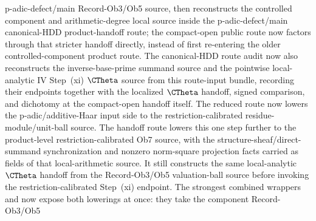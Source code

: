 \begin{proposition}
  p-adic-defect/main Record-Ob3/Ob5 source, then reconstructs the controlled
  component and arithmetic-degree local source inside the
  p-adic-defect/main canonical-HDD product-handoff route; the compact-open
  public route now factors through that stricter handoff directly, instead of
  first re-entering the older controlled-component product route.
  The canonical-HDD route audit now also reconstructs the inverse-base-prime
  summand source and the pointwise local-analytic \IUT{} IV Step~(xi)
  \(\CTheta\) source from this route-input bundle, recording their endpoints
  together with the localized \(\CTheta\) handoff, signed comparison, and
  dichotomy at the compact-open handoff itself.  The reduced route
  now lowers the p-adic/additive-Haar input side to the
  restriction-calibrated residue-module/unit-ball source.  The handoff route
  lowers this one step further to the product-level restriction-calibrated
  Ob7 source, with the structure-sheaf/direct-summand synchronization and
  nonzero norm-square projection facts carried as fields of that
  local-arithmetic source.  It still constructs the same local-analytic
  \(\CTheta\) handoff from the Record-Ob3/Ob5 valuation-ball source before
  invoking the restriction-calibrated Step~(xi) endpoint.  The strongest
  combined wrappers
  and
  now expose both lowerings at once: they take the component Record-Ob3/Ob5

\end{proposition}
